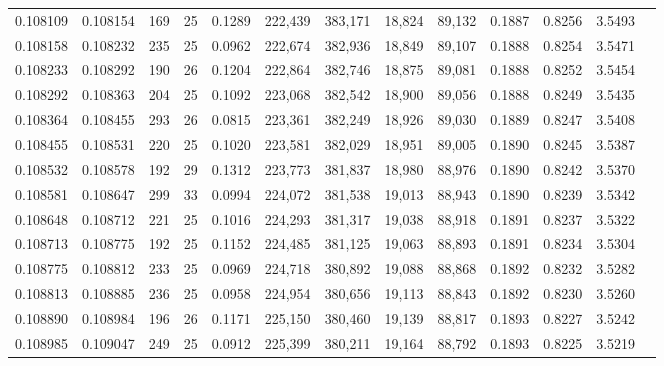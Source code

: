 \begin{tabular}{rrrrrrrrrrrrr}
0.108109 & 0.108154 & 169 &  25 &                                     0.1289 & 222,439 & 383,171 &  18,824 &  89,132 & 0.1887 & 0.8256 & 3.5493 \\
0.108158 & 0.108232 & 235 &  25 &                                     0.0962 & 222,674 & 382,936 &  18,849 &  89,107 & 0.1888 & 0.8254 & 3.5471 \\
0.108233 & 0.108292 & 190 &  26 &                                     0.1204 & 222,864 & 382,746 &  18,875 &  89,081 & 0.1888 & 0.8252 & 3.5454 \\
0.108292 & 0.108363 & 204 &  25 &                                     0.1092 & 223,068 & 382,542 &  18,900 &  89,056 & 0.1888 & 0.8249 & 3.5435 \\
0.108364 & 0.108455 & 293 &  26 &                                     0.0815 & 223,361 & 382,249 &  18,926 &  89,030 & 0.1889 & 0.8247 & 3.5408 \\
0.108455 & 0.108531 & 220 &  25 &                                     0.1020 & 223,581 & 382,029 &  18,951 &  89,005 & 0.1890 & 0.8245 & 3.5387 \\
0.108532 & 0.108578 & 192 &  29 &                                     0.1312 & 223,773 & 381,837 &  18,980 &  88,976 & 0.1890 & 0.8242 & 3.5370 \\
0.108581 & 0.108647 & 299 &  33 &                                     0.0994 & 224,072 & 381,538 &  19,013 &  88,943 & 0.1890 & 0.8239 & 3.5342 \\
0.108648 & 0.108712 & 221 &  25 &                                     0.1016 & 224,293 & 381,317 &  19,038 &  88,918 & 0.1891 & 0.8237 & 3.5322 \\
0.108713 & 0.108775 & 192 &  25 &                                     0.1152 & 224,485 & 381,125 &  19,063 &  88,893 & 0.1891 & 0.8234 & 3.5304 \\
0.108775 & 0.108812 & 233 &  25 &                                     0.0969 & 224,718 & 380,892 &  19,088 &  88,868 & 0.1892 & 0.8232 & 3.5282 \\
0.108813 & 0.108885 & 236 &  25 &                                     0.0958 & 224,954 & 380,656 &  19,113 &  88,843 & 0.1892 & 0.8230 & 3.5260 \\
0.108890 & 0.108984 & 196 &  26 &                                     0.1171 & 225,150 & 380,460 &  19,139 &  88,817 & 0.1893 & 0.8227 & 3.5242 \\
0.108985 & 0.109047 & 249 &  25 &                                     0.0912 & 225,399 & 380,211 &  19,164 &  88,792 & 0.1893 & 0.8225 & 3.5219 \\

\end{tabular}
